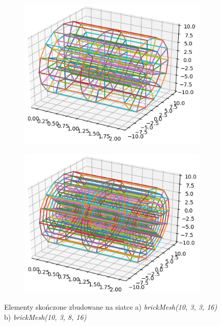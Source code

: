 \begin{figure}
\begin{subfigure}{.5\textwidth}
  \centering
  \includegraphics[width=1.0\linewidth]{Zdjecia/5/hex_elementy1}
  \caption{}
  \label{fig:sfig1}
\end{subfigure}
\begin{subfigure}{.5\textwidth}
  \centering
  \includegraphics[width=1.0\linewidth]{Zdjecia/5/hex_elementy2}
  \caption{}
  \label{fig:sfig2}
\end{subfigure}
\caption{Elementy skończone zbudowane na siatce a) \textit{brickMesh(10, 3, 3, 16)} b) \textit{brickMesh(10, 3, 8, 16)} }
\label{fig:hex_elementy}
\end{figure}

